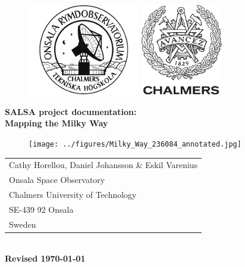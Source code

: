 \begin{titlepage}

\begin{figure}[t]
\vspace{-2cm}
\centering
\includegraphics[height=4cm]{../figures/OSO-logo.jpg}
\hspace{4cm}
\includegraphics[height=4cm]{../figures/CHALMERS-logo.pdf}
\vspace{1cm}
\end{figure}

\begin{center}
\Huge \textbf{
SALSA project documentation: 		\\
\bigskip
Mapping the Milky Way
}
\end{center}

\begin{figure}[!h]
\centering
\texttt{[image: ../figures/Milky\_Way\_236084\_annotated.jpg]}
\end{figure}


\begin{center}
\begin{tabular}{l}
Cathy Horellou, Daniel Johansson \& Eskil Varenius\\
Onsala Space Observatory		\\
Chalmers University of Technology	\\
SE-439 92 Onsala			\\
Sweden					\\
\end{tabular}\\
\vspace{0.5cm}
\yyyymmdddate
{\bf Revised \today \, \currenttime}
\end{center}

\end{titlepage}

